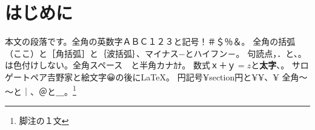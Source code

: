 \documentclass[uplatex,dvipdfmx]{jsarticle}
\begin{document}
\section{はじめに}
本文の段落です。全角の英数字ＡＢＣ１２３と記号！＃＄％＆。
全角の括弧（ここ）と［角括弧］と｛波括弧｝、マイナス−とハイフン－。
句読点，．と、。は色付けしない。全角スペース　と半角カナｶﾅ。
数式$ｘ＋ｙ=z$と\textbf{太字}、。
サロゲートペア𠮷野家と絵文字😀の後に\LaTeX。
円記号¥section{円}と¥¥、¥%
全角～～と｜、＠と＿。\footnote{脚注の１文}
\end{document}
